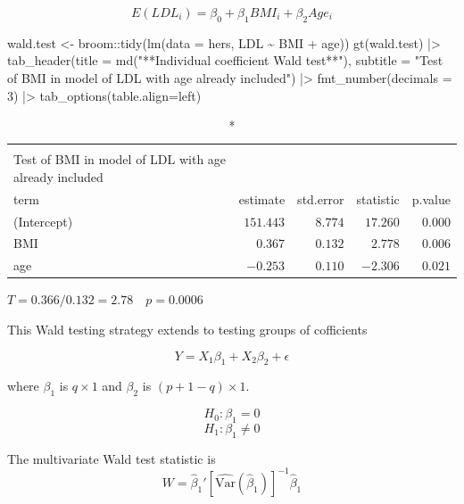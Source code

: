 \documentclass[
  letterpaper,
  DIV=11,
  numbers=noendperiod]{scrreport}
\newenvironment{Shaded}{\begin{snugshade}}{\end{snugshade}}
\newcommand{\AttributeTok}[1]{\textcolor[rgb]{0.40,0.45,0.13}{#1}}
\newcommand{\DecValTok}[1]{\textcolor[rgb]{0.68,0.00,0.00}{#1}}
\newcommand{\FunctionTok}[1]{\textcolor[rgb]{0.28,0.35,0.67}{#1}}
\newcommand{\NormalTok}[1]{\textcolor[rgb]{0.00,0.23,0.31}{#1}}
\newcommand{\OtherTok}[1]{\textcolor[rgb]{0.00,0.23,0.31}{#1}}
\newcommand{\SpecialCharTok}[1]{\textcolor[rgb]{0.37,0.37,0.37}{#1}}
\newcommand{\StringTok}[1]{\textcolor[rgb]{0.13,0.47,0.30}{#1}}
\begin{document}
\[E(LDL_i) = \beta_0 + \beta_1 BMI_i + \beta_2 Age_i\]

\begin{Shaded}
\begin{Highlighting}[]
\NormalTok{wald.test }\OtherTok{\textless{}{-}}\NormalTok{ broom}\SpecialCharTok{::}\FunctionTok{tidy}\NormalTok{(}\FunctionTok{lm}\NormalTok{(}\AttributeTok{data =}\NormalTok{ hers, LDL }\SpecialCharTok{\textasciitilde{}}\NormalTok{ BMI }\SpecialCharTok{+}\NormalTok{ age))}
\FunctionTok{gt}\NormalTok{(wald.test) }\SpecialCharTok{|\textgreater{}} 
  \FunctionTok{tab\_header}\NormalTok{(}\AttributeTok{title =} 
               \FunctionTok{md}\NormalTok{(}\StringTok{"**Individual coefficient Wald test**"}\NormalTok{),}
             \AttributeTok{subtitle =} \StringTok{"Test of BMI in model of LDL with age already included"}\NormalTok{) }\SpecialCharTok{|\textgreater{}} 
  \FunctionTok{fmt\_number}\NormalTok{(}\AttributeTok{decimals =} \DecValTok{3}\NormalTok{) }\SpecialCharTok{|\textgreater{}} 
  \FunctionTok{tab\_options}\NormalTok{(}\AttributeTok{table.align=}\StringTok{\textquotesingle{}left\textquotesingle{}}\NormalTok{)}
\end{Highlighting}
\end{Shaded}

\begin{longtable}{lrrrr}
\caption*{
{\large \textbf{Individual coefficient Wald test}} \\ 
{\small Test of BMI in model of LDL with age already included}
} \\ 
\toprule
term & estimate & std.error & statistic & p.value \\ 
\midrule
(Intercept) & $151.443$ & $8.774$ & $17.260$ & $0.000$ \\ 
BMI & $0.367$ & $0.132$ & $2.778$ & $0.006$ \\ 
age & $-0.253$ & $0.110$ & $-2.306$ & $0.021$ \\ 
\bottomrule
\end{longtable}

\(T = 0.366/0.132 = 2.78 \quad p = 0.0006\)

This Wald testing strategy extends to testing groups of cofficients

\[Y = X_1 \beta_1 + X_2 \beta_2 + \epsilon\]

where \(\beta_1\) is \(q \times 1\) and \(\beta_2\) is
\((p + 1 - q) \times 1\).

\[H_0: \beta_1 = 0\] \[H_1: \beta_1 \neq 0\]

The multivariate Wald test statistic is
\[W = \hat \beta_1' \left[ \widehat{\text{Var}}(\hat \beta_1 ) \right]^{-1}  \hat \beta_1\]
\end{document}
